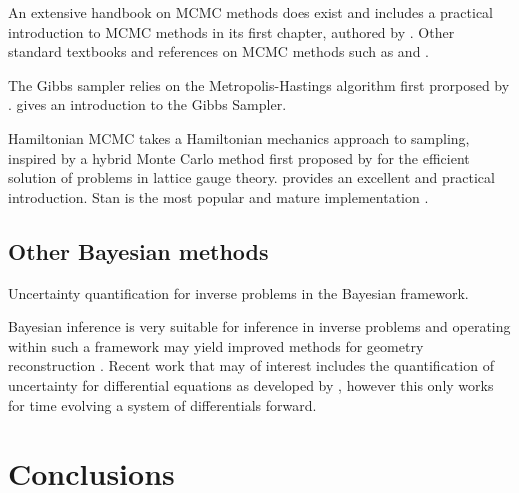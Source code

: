 An extensive handbook on MCMC methods does exist \citep{Brooks11} and includes a practical introduction to MCMC methods in its first chapter, authored by \citet{Geyer11}. Other standard textbooks and references on MCMC methods such as \citet{Gilks95} and \citet{Christian99}.


The Gibbs sampler relies on the Metropolis-Hastings algorithm first prorposed by \citet{Metropolis53}. \citet{Casella92} gives an introduction to the Gibbs Sampler.

Hamiltonian MCMC takes a Hamiltonian mechanics approach to sampling, inspired by a hybrid Monte Carlo method first proposed by \citet{Duane87} for the efficient solution of problems in lattice gauge theory. \citet{Neal11} provides an excellent and practical introduction. Stan is the most popular and mature implementation \citet{Carpenter17}.

\subsection{Other Bayesian methods}
Uncertainty quantification for inverse problems in the Bayesian framework.

Bayesian inference is very suitable for inference in inverse problems and operating within such a framework may yield improved methods for geometry reconstruction \citet{Stuart10}. Recent work that may of interest includes the quantification of uncertainty for differential equations as developed by \citet{Chkrebtii16}, however this only works for time evolving a system of differentials forward.



\section{Conclusions}